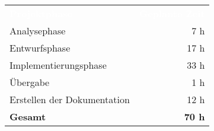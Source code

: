 \begin{tabular}{lr}
\rowcolor{heading}\textcolor{white}{\textbf{Projektphase}} & \textcolor{white}{\textbf{Geplante Zeit}} \\
Analysephase & 7 h \\
\rowcolor{odd} Entwurfsphase & 17 h \\
Implementierungsphase & 33 h \\
\rowcolor{odd} Übergabe & 1 h \\
Erstellen der Dokumentation & 12 h \\
\hline
\hline
\rowcolor{odd}\textbf{Gesamt} & \textbf{70 h} \\
\end{tabular}
